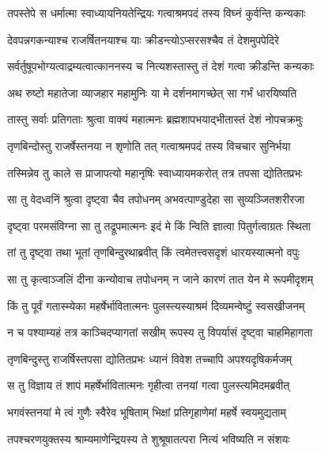 \twolineshloka
{तपस्तेपे स धर्मात्मा स्वाध्यायनियतेन्द्रियः}
{गत्वाश्रमपदं तस्य विघ्नं कुर्वन्ति कन्यकाः} %

\twolineshloka
{देवपन्नगकन्याश्च राजर्षितनयाश्च याः}
{क्रीडन्त्योऽप्सरसश्चैव तं देशमुपपेदिरे} %

\twolineshloka
{सर्वर्तुषूपभोग्यत्वाद्रम्यत्वात्काननस्य च}
{नित्यशस्तास्तु तं देशं गत्वा क्रीडन्ति कन्यकाः} %

\twolineshloka
{अथ रुष्टो महातेजा व्याजहार महामुनिः}
{या मे दर्शनमागच्छेत् सा गर्भं धारयिष्यति} %

\twolineshloka
{तास्तु सर्वाः प्रतिगताः श्रुत्वा वाक्यं महात्मनः}
{ब्रह्मशापभयाद्भीतास्तं देशं नोपचक्रमुः} %

\twolineshloka
{तृणबिन्दोस्तु राजर्षेस्तनया न शृणोति तत्}
{गत्वाश्रमपदं तस्य विचचार सुनिर्भया} %

\twolineshloka
{तस्मिन्नेव तु काले स प्राजापत्यो महानृषिः}
{स्वाध्यायमकरोत् तत्र तपसा द्योतितप्रभः} %

\twolineshloka
{सा तु वेदध्वनिं श्रुत्वा दृष्ट्वा चैव तपोधनम्}
{अभवत्पाण्डुदेहा सा सुव्यञ्जितशरीरजा} %

\twolineshloka
{दृष्ट्वा परमसंविग्ना सा तु तद्रूपमात्मनः}
{इदं मे किं न्विति ज्ञात्वा पितुर्गत्वाग्रतः स्थिता} %

\twolineshloka
{तां तु दृष्ट्वा तथा भूतां तृणबिन्दुरथाब्रवीत्}
{किं त्वमेतत्त्वसदृशं धारयस्यात्मनो वपुः} %

\twolineshloka
{सा तु कृत्वाञ्जलिं दीना कन्योवाच तपोधनम्}
{न जाने कारणं तात येन मे रूपमीदृशम्} %

\twolineshloka
{किं तु पूर्वं गतास्म्येका महर्षेर्भावितात्मनः}
{पुलस्त्यस्याश्रमं दिव्यमन्वेष्टुं स्वसखीजनम्} %

\twolineshloka
{न च पश्याम्यहं तत्र काञ्चिदप्यागतां सखीम्}
{रूपस्य तु विपर्यासं दृष्ट्वा चाहमिहागता} %

\twolineshloka
{तृणबिन्दुस्तु राजर्षिस्तपसा द्योतितप्रभः}
{ध्यानं विवेश तच्चापि अपश्यदृषिकर्मजम्} %

\twolineshloka
{स तु विज्ञाय तं शापं महर्षेर्भावितात्मनः}
{गृहीत्वा तनयां गत्वा पुलस्त्यमिदमब्रवीत्} %

\twolineshloka
{भगवंस्तनयां मे त्वं गुणैः स्वैरेव भूषिताम्}
{भिक्षां प्रतिगृहाणेमां महर्षे स्वयमुद्यताम्} %

\twolineshloka
{तपश्चरणयुक्तस्य श्राम्यमाणेन्द्रियस्य ते}
{शुश्रूषातत्परा नित्यं भविष्यति न संशयः} %

